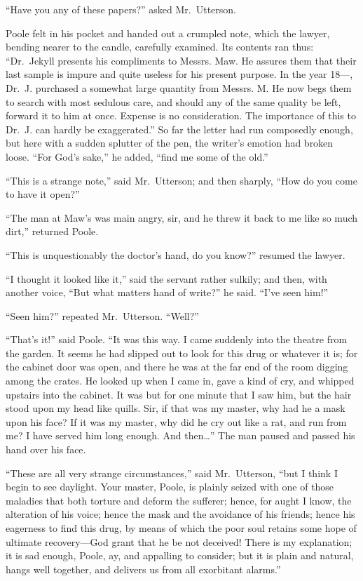 \documentclass[12pt,openright]{book}
\begin{document}
“Have you any of these papers?” asked Mr. Utterson.

Poole felt in his pocket and handed out a crumpled note, which the lawyer, bending nearer to the candle, carefully examined. Its contents ran thus: “Dr. Jekyll presents his compliments to Messrs. Maw. He assures them that their last sample is impure and quite useless for his present purpose. In the year 18—, Dr. J. purchased a somewhat large quantity from Messrs. M. He now begs them to search with most sedulous care, and should any of the same quality be left, forward it to him at once. Expense is no consideration. The importance of this to Dr. J. can hardly be exaggerated.” So far the letter had run composedly enough, but here with a sudden splutter of the pen, the writer’s emotion had broken loose. “For God’s sake,” he added, “find me some of the old.”

“This is a strange note,” said Mr. Utterson; and then sharply, “How do you come to have it open?”

“The man at Maw’s was main angry, sir, and he threw it back to me like so much dirt,” returned Poole.

“This is unquestionably the doctor’s hand, do you know?” resumed the lawyer.

“I thought it looked like it,” said the servant rather sulkily; and then, with another voice, “But what matters hand of write?” he said. “I’ve seen him!”

“Seen him?” repeated Mr. Utterson. “Well?”

“That’s it!” said Poole. “It was this way. I came suddenly into the theatre from the garden. It seems he had slipped out to look for this drug or whatever it is; for the cabinet door was open, and there he was at the far end of the room digging among the crates. He looked up when I came in, gave a kind of cry, and whipped upstairs into the cabinet. It was but for one minute that I saw him, but the hair stood upon my head like quills. Sir, if that was my master, why had he a mask upon his face? If it was my master, why did he cry out like a rat, and run from me? I have served him long enough. And then…” The man paused and passed his hand over his face.

“These are all very strange circumstances,” said Mr. Utterson, “but I think I begin to see daylight. Your master, Poole, is plainly seized with one of those maladies that both torture and deform the sufferer; hence, for aught I know, the alteration of his voice; hence the mask and the avoidance of his friends; hence his eagerness to find this drug, by means of which the poor soul retains some hope of ultimate recovery—God grant that he be not deceived! There is my explanation; it is sad enough, Poole, ay, and appalling to consider; but it is plain and natural, hangs well together, and delivers us from all exorbitant alarms.”
\end{document}

